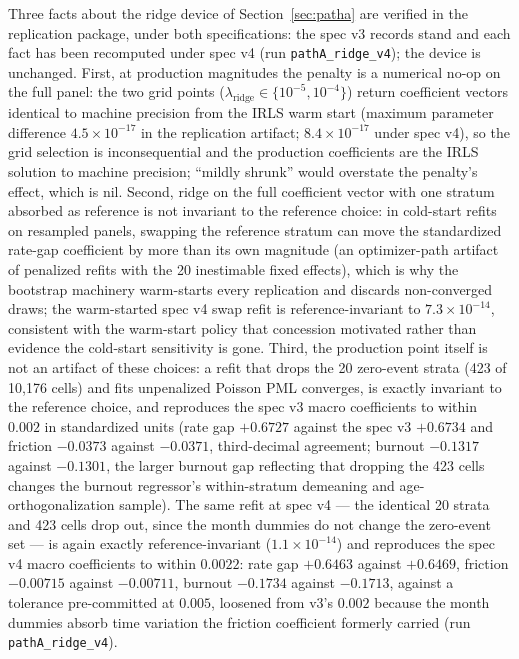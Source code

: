 \documentclass[12pt]{article}
\begin{document}
Three facts about the ridge device of Section~\ref{sec:patha} are verified in the replication package, under both specifications: the spec v3 records stand and each fact has been recomputed under spec v4 (run \texttt{pathA\_ridge\_v4}); the device is unchanged. First, at production magnitudes the penalty is a numerical no-op on the full panel: the two grid points ($\lambda_{\mathrm{ridge}} \in \{10^{-5}, 10^{-4}\}$) return coefficient vectors identical to machine precision from the IRLS warm start (maximum parameter difference $4.5\times10^{-17}$ in the replication artifact; $8.4\times10^{-17}$ under spec v4), so the grid selection is inconsequential and the production coefficients are the IRLS solution to machine precision; ``mildly shrunk'' would overstate the penalty's effect, which is nil. Second, ridge on the full coefficient vector with one stratum absorbed as reference is not invariant to the reference choice: in cold-start refits on resampled panels, swapping the reference stratum can move the standardized rate-gap coefficient by more than its own magnitude (an optimizer-path artifact of penalized refits with the 20 inestimable fixed effects), which is why the bootstrap machinery warm-starts every replication and discards non-converged draws; the warm-started spec v4 swap refit is reference-invariant to $7.3\times10^{-14}$, consistent with the warm-start policy that concession motivated rather than evidence the cold-start sensitivity is gone. Third, the production point itself is not an artifact of these choices: a refit that drops the 20 zero-event strata (423 of 10,176 cells) and fits unpenalized Poisson PML converges, is exactly invariant to the reference choice, and reproduces the spec v3 macro coefficients to within $0.002$ in standardized units (rate gap $+0.6727$ against the spec v3 $+0.6734$ and friction $-0.0373$ against $-0.0371$, third-decimal agreement; burnout $-0.1317$ against $-0.1301$, the larger burnout gap reflecting that dropping the 423 cells changes the burnout regressor's within-stratum demeaning and age-orthogonalization sample). The same refit at spec v4 --- the identical 20 strata and 423 cells drop out, since the month dummies do not change the zero-event set --- is again exactly reference-invariant ($1.1\times10^{-14}$) and reproduces the spec v4 macro coefficients to within $0.0022$: rate gap $+0.6463$ against $+0.6469$, friction $-0.00715$ against $-0.00711$, burnout $-0.1734$ against $-0.1713$, against a tolerance pre-committed at $0.005$, loosened from v3's $0.002$ because the month dummies absorb time variation the friction coefficient formerly carried (run \texttt{pathA\_ridge\_v4}).
\end{document}
